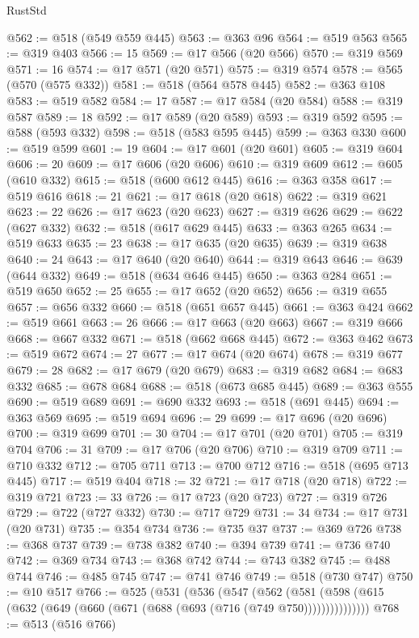 \begin{lexlean}{RustStd}
\begin{coremodule}
{\begin{coremodule}
{{{{{{{{{{{{{{{{{{{{{{{{{{{{{{{{{{{{{{{{{{{{{{{{{{@562 := @518 (@549 @559 @445)
@563 := @363 @96
@564 := @519 @563
@565 := @319 @403
@566 := 15
@569 := @17 @566 (@20 @566)
@570 := @319 @569
@571 := 16
@574 := @17 @571 (@20 @571)
@575 := @319 @574
@578 := @565 (@570 (@575 @332))
@581 := @518 (@564 @578 @445)
@582 := @363 @108
@583 := @519 @582
@584 := 17
@587 := @17 @584 (@20 @584)
@588 := @319 @587
@589 := 18
@592 := @17 @589 (@20 @589)
@593 := @319 @592
@595 := @588 (@593 @332)
@598 := @518 (@583 @595 @445)
@599 := @363 @330
@600 := @519 @599
@601 := 19
@604 := @17 @601 (@20 @601)
@605 := @319 @604
@606 := 20
@609 := @17 @606 (@20 @606)
@610 := @319 @609
@612 := @605 (@610 @332)
@615 := @518 (@600 @612 @445)
@616 := @363 @358
@617 := @519 @616
@618 := 21
@621 := @17 @618 (@20 @618)
@622 := @319 @621
@623 := 22
@626 := @17 @623 (@20 @623)
@627 := @319 @626
@629 := @622 (@627 @332)
@632 := @518 (@617 @629 @445)
@633 := @363 @265
@634 := @519 @633
@635 := 23
@638 := @17 @635 (@20 @635)
@639 := @319 @638
@640 := 24
@643 := @17 @640 (@20 @640)
@644 := @319 @643
@646 := @639 (@644 @332)
@649 := @518 (@634 @646 @445)
@650 := @363 @284
@651 := @519 @650
@652 := 25
@655 := @17 @652 (@20 @652)
@656 := @319 @655
@657 := @656 @332
@660 := @518 (@651 @657 @445)
@661 := @363 @424
@662 := @519 @661
@663 := 26
@666 := @17 @663 (@20 @663)
@667 := @319 @666
@668 := @667 @332
@671 := @518 (@662 @668 @445)
@672 := @363 @462
@673 := @519 @672
@674 := 27
@677 := @17 @674 (@20 @674)
@678 := @319 @677
@679 := 28
@682 := @17 @679 (@20 @679)
@683 := @319 @682
@684 := @683 @332
@685 := @678 @684
@688 := @518 (@673 @685 @445)
@689 := @363 @555
@690 := @519 @689
@691 := @690 @332
@693 := @518 (@691 @445)
@694 := @363 @569
@695 := @519 @694
@696 := 29
@699 := @17 @696 (@20 @696)
@700 := @319 @699
@701 := 30
@704 := @17 @701 (@20 @701)
@705 := @319 @704
@706 := 31
@709 := @17 @706 (@20 @706)
@710 := @319 @709
@711 := @710 @332
@712 := @705 @711
@713 := @700 @712
@716 := @518 (@695 @713 @445)
@717 := @519 @404
@718 := 32
@721 := @17 @718 (@20 @718)
@722 := @319 @721
@723 := 33
@726 := @17 @723 (@20 @723)
@727 := @319 @726
@729 := @722 (@727 @332)
@730 := @717 @729
@731 := 34
@734 := @17 @731 (@20 @731)
@735 := @354 @734
@736 := @735 @37
@737 := @369 @726
@738 := @368 @737
@739 := @738 @382
@740 := @394 @739
@741 := @736 @740
@742 := @369 @734
@743 := @368 @742
@744 := @743 @382
@745 := @488 @744
@746 := @485 @745
@747 := @741 @746
@749 := @518 (@730 @747)
@750 := @10 @517
@766 := @525
    (@531
      (@536
        (@547
          (@562
            (@581 (@598 (@615 (@632 (@649 (@660 (@671 (@688 (@693 (@716 (@749 @750)))))))))))))))
@768 := @513 (@516 @766)
}}}}}}}}}}}}}}}}}}}}}}}}}}}}}}}}}}}}}}}}}}}}}}}}}}
\end{coremodule}}
\end{coremodule}
\end{lexlean}
